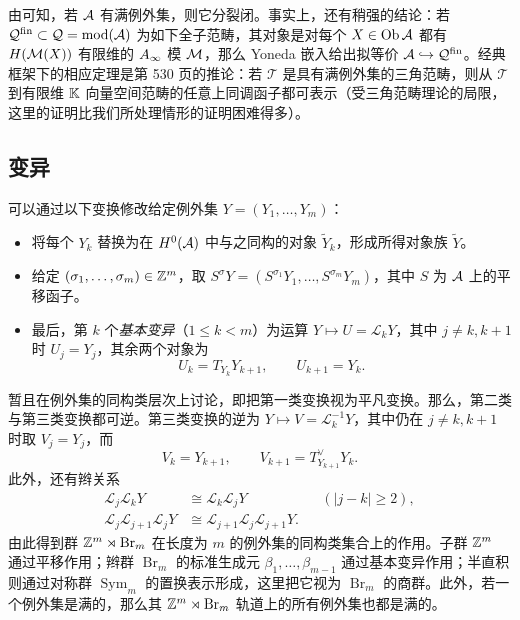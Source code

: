 \begin{note}\label{st:5.14}
由可知，若 $\mathcal A$ 有满例外集，则它分裂闭。事实上，还有稍强的结论：若 $\mathcal Q^{\mathrm{fin}}\subset\mathcal Q=\operatorname{mod}(\mathcal A)$ 为如下全子范畴，其对象是对每个 $X\in\operatorname{Ob}\mathcal A$ 都有 $H(\mathcal M(X))$ 有限维的 $A_\infty$ 模 $\mathcal M$，那么 Yoneda 嵌入给出拟等价 $\mathcal A\hookrightarrow\mathcal Q^{\mathrm{fin}}$。经典框架下的相应定理是第 530 页的推论：若 $\mathcal T$ 是具有满例外集的三角范畴，则从 $\mathcal T$ 到有限维 $\mathbb K$ 向量空间范畴的任意上同调函子都可表示（受三角范畴理论的局限，这里的证明比我们所处理情形的证明困难得多）。
\end{note}

\subsection{变异}\label{sec:5j}
可以通过以下变换修改给定例外集 $Y=(Y_1,\ldots,Y_m)$：
\begin{itemize}
\item 将每个 $Y_k$ 替换为在 $H^0(\mathcal A)$ 中与之同构的对象 $\widetilde Y_k$，形成所得对象族 $\widetilde Y$。
\item 给定 $(\sigma_1,\ldots,\sigma_m)\in\mathbb Z^m$，取 $S^{\sigma}Y=(S^{\sigma_1}Y_1,\ldots,S^{\sigma_m}Y_m)$，其中 $S$ 为 $\mathcal A$ 上的平移函子。
\item 最后，第 $k$ 个\emph{基本变异}（$1\leq k<m$）为运算 $Y\mapsto U=\mathscr L_kY$，其中 $j\ne k,k+1$ 时 $U_j=Y_j$，其余两个对象为
\begin{equation}\label{eq:5.24}
U_k=T_{Y_k}Y_{k+1},\qquad U_{k+1}=Y_k.
\end{equation}
\end{itemize}
暂且在例外集的同构类层次上讨论，即把第一类变换视为平凡变换。那么，第二类与第三类变换都可逆。第三类变换的逆为 $Y\mapsto V=\mathscr L_k^{-1}Y$，其中仍在 $j\ne k,k+1$ 时取 $V_j=Y_j$，而
\[
V_k=Y_{k+1},\qquad V_{k+1}=T_{Y_{k+1}}^{\vee}Y_k.
\]
此外，还有辫关系
\[
\begin{aligned}
\mathscr L_j\mathscr L_kY&\cong\mathscr L_k\mathscr L_jY&&(|j-k|\geq2),\\
\mathscr L_j\mathscr L_{j+1}\mathscr L_jY&\cong\mathscr L_{j+1}\mathscr L_j\mathscr L_{j+1}Y.
\end{aligned}
\]
由此得到群 $\mathbb Z^m\rtimes\operatorname{Br}_m$ 在长度为 $m$ 的例外集的同构类集合上的作用。子群 $\mathbb Z^m$ 通过平移作用；辫群 $\operatorname{Br}_m$ 的标准生成元 $\beta_1,\ldots,\beta_{m-1}$ 通过基本变异作用；半直积则通过对称群 $\operatorname{Sym}_m$ 的置换表示形成，这里把它视为 $\operatorname{Br}_m$ 的商群。此外，若一个例外集是满的，那么其 $\mathbb Z^m\rtimes\operatorname{Br}_m$ 轨道上的所有例外集也都是满的。
